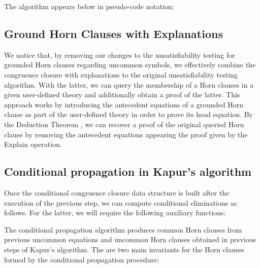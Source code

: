 The algorithm appears below in pseudo-code notation:





\subsection{Ground Horn Clauses with Explanations}

We notice that, by removing our changes to the unsatisfiability testing
for grounded Horn clauses regarding uncommon symbols, we effectively combine
the congruence closure with explanations to the original unsatisfiability
testing algorithm. With the latter, we can query the membership of a Horn
clauses in a given user-defined theory and additionally obtain a proof of
the latter. This approach works by introducing the antecedent equations of
a grounded Horn clause as part of the user-defined theory in order to prove
its head equation. By the Deduction Theorem \cite{10.5555/1642730}, we can
recover a proof of the original queried Horn clause by removing the antecedent
equations appearing the proof given by the Explain operation.

\subsection{Conditional propagation in Kapur's algorithm}

Once the conditional congruence closure data structure is built after 
the execution of the previous step, we can compute conditional eliminations
as follows. For the latter, we will require the following auxiliary functions:







The conditional propagation algorithm produces common Horn clauses from previous
uncommon equations and uncommon Horn clauses obtained in previous steps of Kapur's
algorithm. The are two main invariants for the Horn clauses formed by the
conditional propagation procedure: 

